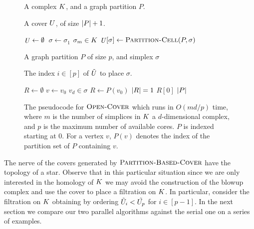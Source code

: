 \begin{figure}[h!]
\begin{multicols}{2}
{
\begin{description}
\addtolength{\itemsep}{-.65\baselineskip}
\item[\small\textbf{Input:}] \small A complex $K$, and a graph partition $P$.
\item[\small\textbf{Output:}] \small A cover $U$, of size $|P|+1$.
\end{description}
\vspace{-.6cm}
\begin{codebox}
 \li	$\id{\C} \gets \emptyset$
 \li  \Parfor\,$ \sigma \gets \sigma_1$ \To $\sigma_m \in K$
 \li 	   \Do  $\id{\C}[\sigma] \gets \proc{Partition-Cell}(P,\sigma)$
          \End
 \li \Return \id{\C}
  \End
\end{codebox}
}
{
\begin{description}
\addtolength{\itemsep}{-.65\baselineskip}
\item[\small \textbf{Input:}] \small A graph partition $P$ of size $p$, and simplex $\sigma$
\item[\small \textbf{Output:}] \small The index $i \in [p]$ of  $\tilde{U}$ to place $\sigma$.
\end{description}
\vspace{-.65cm}
\begin{codebox}
 \li	$R \gets \emptyset$
 \li  \For $v \gets v_0$ \To $v_d \in \sigma$
 \li 	   \Do $R \gets P(v_0)$
          \End
 \li	\If $|R| = 1$ \Return $R[0]$
 \li    \Else \Return $|P|$
\end{codebox}
}
\end{multicols}
\caption{The pseudocode for $\textnormal{\scshape Open-Cover}$ which runs in $O(md/p)$ time, where $m$ is the 
number of simplices in $K$ a $d$-dimensional complex, and $p$ is the 
maximum number of available cores. $P$ is indexed starting at 0. For a vertex $v$, $P(v)$ 
denotes the index of the partition set of $P$ containing $v$.
}
\label{alg:open-cov}
\end{figure}
The nerve of the covers generated by $\textnormal{\scshape Partition-Based-Cover}$ have the topology of a star. 
Observe that in this particular situation since we are only interested in the homology of $K$ we may avoid the 
construction of the blowup complex and use the cover to place a filtration on $K$. In particular, consider the filtration on $K$ obtaining by 
ordering $\tilde{U}_i < \tilde{U_p}$ for $i \in [p-1]$. In the next section we compare our two parallel algorithms against 
the serial one on a series of examples.
\vspace{-5mm} 
